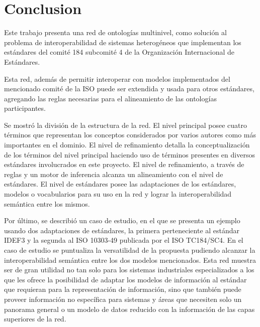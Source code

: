 \documentclass[journal]{IEEEtran}
\begin{document}




\section{Conclusion}

Este trabajo presenta una red de ontolog\'ias multinivel, como soluci\'on al problema de interoperabilidad de sistemas heterog\'eneos que implementan los est\'andares del comit\'e 184 subcomit\'e 4 de la Organizaci\'on Internacional de Est\'andares. 

Esta red, adem\'as de permitir interoperar con modelos implementados del mencionado comit\'e de la ISO puede ser extendida y usada para otros est\'andares, agregando las reglas necesarias para el alineamiento de las ontolog\'ias participantes. 

Se mostr\'o la divisi\'on de la estructura de la red. El nivel principal posee cuatro t\'erminos que representan los conceptos considerados por varios autores como m\'as importantes en el dominio. El nivel de refinamiento detalla la conceptualizaci\'on de los t\'erminos del nivel principal haciendo uso de t\'erminos presentes en diversos est\'andares involucrados en este proyecto. El nivel de refinamiento, a trav\'es de reglas y un motor de inferencia alcanza un alineamiento con el nivel de est\'andares. El nivel de est\'andares posee las adaptaciones de los est\'andares, modelos o vocabularios para su uso en la red y lograr la interoperabilidad sem\'antica entre los mismos. 

Por \'ultimo, se describi\'o un caso de estudio, en el que se presenta un ejemplo usando dos adaptaciones de est\'andares, la primera perteneciente al est\'andar IDEF3 y la segunda al ISO 10303-49 publicada por el ISO TC184/SC4. En el caso de estudio se puntualiza la versatilidad de la propuesta pudiendo alcanzar la interoperabilidad sem\'antica entre los dos modelos mencionados. Esta red muestra ser de gran utilidad no tan solo para los sistemas industriales especializados a los que les ofrece la posibilidad de adaptar los modelos de informaci\'on al est\'andar que requieran para la representaci\'on de informaci\'on, sino que tambi\'en puede proveer informaci\'on no espec\'ifica para sistemas y \'areas que necesiten solo un panorama general o un modelo de datos reducido con la informaci\'on de las capas superiores de la red. 
\end{document}
